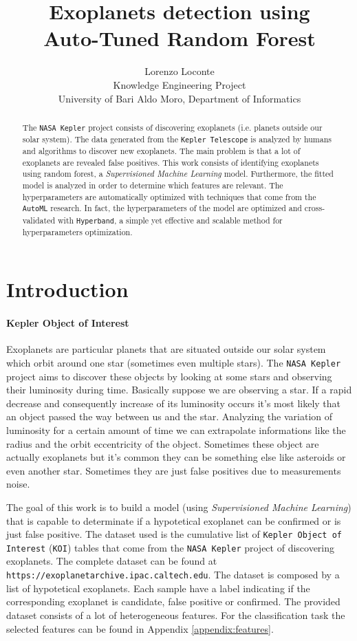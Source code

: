 \documentclass[11pt, a4paper]{article}
\date{}
\title{Exoplanets detection using \\ Auto-Tuned Random Forest}
\author{Lorenzo Loconte \\ \small Knowledge Engineering Project \\ \small University of Bari Aldo Moro, Department of Informatics}
\begin{document}
\maketitle
\begin{abstract}
  The \texttt{NASA Kepler} project consists of discovering exoplanets (i.e. planets outside our solar system).
  The data generated from the \texttt{Kepler Telescope} is analyzed by humans and algorithms to discover new exoplanets.
  The main problem is that a lot of exoplanets are revealed false positives.
  This work consists of identifying exoplanets using random forest, a \textit{Supervisioned Machine Learning} model.
  Furthermore, the fitted model is analyzed in order to determine which features are relevant.
  The hyperparameters are automatically optimized with techniques that come from the \texttt{AutoML} research.
  In fact, the hyperparameters of the model are optimized and cross-validated with \texttt{Hyperband}, a simple yet effective and scalable method for hyperparameters optimization.
\end{abstract}

\clearpage

\section{Introduction}
  \paragraph{Kepler Object of Interest}
    Exoplanets are particular planets that are situated outside our solar system which orbit around one star (sometimes even multiple stars).
    The \texttt{NASA Kepler} project aims to discover these objects by looking at some stars and observing their luminosity during time.
    Basically suppose we are observing a star.
    If a rapid decrease and consequently increase of its luminosity occurs it's most likely that an object passed the way between us and the star.
    Analyzing the variation of luminosity for a certain amount of time we can extrapolate informations like the radius and the orbit eccentricity of the object.
    Sometimes these object are actually exoplanets but it's common they can be something else like asteroids or even another star.
    Sometimes they are just false positives due to measurements noise.

    The goal of this work is to build a model (using \textit{Supervisioned Machine Learning}) that is capable to determinate if a hypotetical exoplanet can be confirmed or is just false positive.
    The dataset used is the cumulative list of \texttt{Kepler Object of Interest} (\texttt{KOI}) tables that come from the \texttt{NASA Kepler} project of discovering exoplanets.
    The complete dataset can be found at \texttt{https://exoplanetarchive.ipac.caltech.edu}.
    The dataset is composed by a list of hypotetical exoplanets.
    Each sample have a label indicating if the corresponding exoplanet is candidate, false positive or confirmed.
    The provided dataset consists of a lot of heterogeneous features.
    For the classification task the selected features can be found in Appendix \ref{appendix:features}.
    
\end{document}
